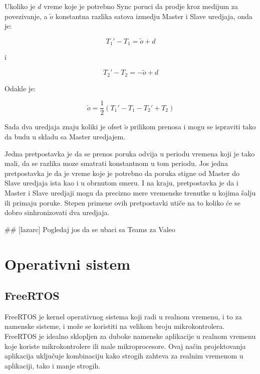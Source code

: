 \documentclass[a4paper,12pt, master]{etf}
\begin{document}
	Ukoliko je $d$ vreme koje je potrebno Sync poruci da prodje kroz medijum za povezivanje, a
    $\tilde{o}$	konstantna razlika satova izmedju Master i Slave uredjaja, onda je:

	\begin{equation}
		T_1' - T_1 = \tilde{o} + d
	\end{equation}

	i

	\begin{equation}
			T_2' - T_2 = -\tilde{o} + d
	\end{equation}

	Odakle je:

	\begin{equation}
		\tilde{o} = \frac{1}{2} (T_1' - T_1 - T_2' + T_2)
	\end{equation}

	Sada dva uredjaja znaju koliki je ofset $\tilde{o}$ prilikom prenosa i mogu se ispraviti
	tako da budu u skladu sa Master uredjajem.

	Jedna pretpostavka je da se prenos poruka odvija u periodu vremena koji je tako mali, da se
	razlika moze smatrati konstantnom u tom periodu. Jos jedna pretpostavka je da je vreme
	koje je	potrebno da poruka stigne od Master do Slave uredjaja ista kao i u obrnutom smeru.
	I na kraju, pretpostavka je da i Master i Slave uredjaji mogu da precizno mere vremenske
        trenutke u kojima \v{s}alju ili primaju poruke. Stepen primene ovih pretpostavki uti\v{c}e
        na to koliko \'{c}e se dobro sinhronizovati dva uredjaja.

        \#\# [lazarc] Pogledaj jos da se ubaci sa Teams za Valeo

	\newpage

	\chapter{Operativni sistem}

	\section{FreeRTOS}

	FreeRTOS je kernel operativnog sistema koji radi u realnom vremenu, i to za namenske
	sisteme, i mo\v{z}e se koristiti na velikom broju mikrokontrolera. FreeRTOS je idealno sklopljen
	za duboke namenske aplikacije u realnom vremenu koje koriste mikrokontrolere ili male mikroprocesore.
	Ovaj na\v{c}in projektovanja aplikacija uklju\v{c}uje kombinaciju kako strogih zahteva za realnim
	vremenom u aplikaciji, tako i manje strogih.
\end{document}

